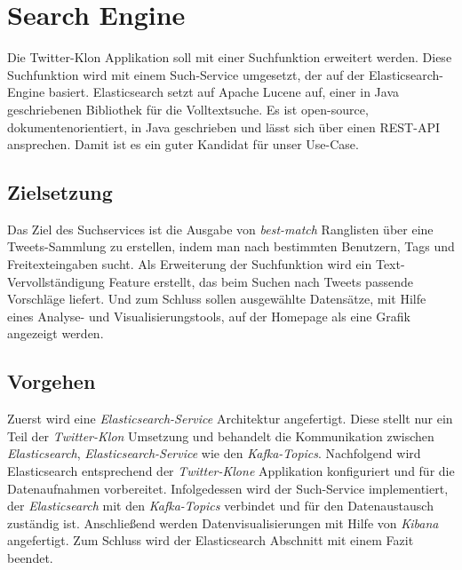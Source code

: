 

\chapter{Search Engine}
Die Twitter-Klon Applikation soll mit einer Suchfunktion erweitert werden. Diese Suchfunktion wird mit einem Such-Service umgesetzt, der auf der Elasticsearch-Engine basiert. Elasticsearch setzt auf Apache Lucene auf, einer in Java geschriebenen Bibliothek für die Volltextsuche. Es ist open-source, dokumentenorientiert, in Java geschrieben und lässt sich über einen REST-API ansprechen. Damit ist es ein guter Kandidat für unser Use-Case.

\section{Zielsetzung}
Das Ziel des Suchservices ist die Ausgabe von \textit{best-match} Ranglisten über eine Tweets-Sammlung zu erstellen, indem man nach bestimmten Benutzern, Tags und Freitexteingaben sucht. Als Erweiterung der Suchfunktion wird ein Text-Vervollständigung Feature erstellt, das beim Suchen nach Tweets passende Vorschläge liefert. Und zum Schluss sollen ausgewählte Datensätze, mit Hilfe eines Analyse- und Visualisierungstools, auf der Homepage als eine Grafik angezeigt werden. 

\section{Vorgehen}
Zuerst wird eine \textit{Elasticsearch-Service} Architektur angefertigt. Diese stellt nur ein Teil der \textit{Twitter-Klon} Umsetzung und behandelt die Kommunikation zwischen \textit{Elasticsearch}, \textit{Elasticsearch-Service} wie den \textit{Kafka-Topics}. Nachfolgend wird Elasticsearch entsprechend der \textit{Twitter-Klone} Applikation konfiguriert und für die Datenaufnahmen vorbereitet. Infolgedessen wird der Such-Service implementiert, der \textit{Elasticsearch} mit den \textit{Kafka-Topics} verbindet und für den Datenaustausch zuständig ist. Anschließend werden Datenvisualisierungen mit Hilfe von \textit{Kibana} angefertigt. Zum Schluss wird der Elasticsearch Abschnitt mit einem Fazit beendet.

